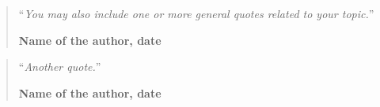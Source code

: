 \thispagestyle{empty}
\vspace*{5cm}

\todo{}

\begin{quotation}
  \noindent ``\emph{You may also include one or more general quotes related to your topic.}''
  \begin{flushright}\textbf{Name of the author, date}\end{flushright}
\end{quotation}

\medskip

\begin{quotation}
  \noindent ``\emph{Another quote.}''
  \begin{flushright}\textbf{Name of the author, date}\end{flushright}
\end{quotation}
